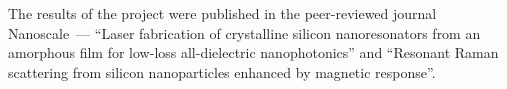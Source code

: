         The results of the project were published in the peer-reviewed journal Nanoscale~--- ``Laser fabrication of
    crystalline silicon nanoresonators from an amorphous film for low-loss all-dielectric nanophotonics''\cite{dmitriev2016laser} and
    ``Resonant Raman scattering from silicon nanoparticles enhanced by magnetic response''\cite{dmitriev2016resonant}.

\clearpage

